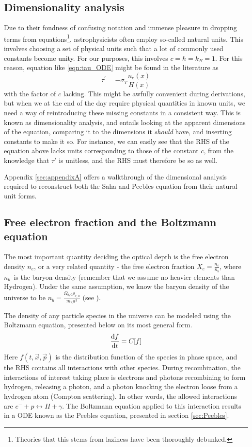 \documentclass[10pt, a4paper]{article}
\begin{document}
\subsection{Dimensionality analysis}
Due to their fondness of confusing notation and immense pleasure in dropping terms from equations\footnote{Theories that this stems from laziness have been thoroughly debunked.}, astrophysicists often employ so-called natural units. This involves choosing a set of physical units such that a lot of commonly used constants become unity. For our purposes, this involves $c = \hbar = k_B = 1$. For this reason, equation like \ref{eqn:tau_ODE} might be found in the literature as
\begin{equation*}
    \tau^\prime = - \sigma_T\frac{n_{e}(x)}{H(x)}
\end{equation*}
with the factor of $c$ lacking. This might be awfully convenient during derivations, but when we at the end of the day require physical quantities in known units, we need a way of reintroducing these missing constants in a consistent way. This is known as dimensionality analysis, and entails looking at the apparent dimensions of the equation, comparing it to the dimensions it \textit{should} have, and inserting constants to make it so. For instance, we can easily see that the RHS of the equation above lacks units corresponding to those of the constant $c$, from the knowledge that $\tau'$ is unitless, and the RHS must therefore be so as well.

Appendix \ref{sec:appendixA} offers a walkthrough of the dimensional analysis required to reconstruct both the Saha and Peebles equation from their natural-unit forms.


\subsection{Free electron fraction and the Boltzmann equation}
The most important quantity deciding the optical depth is the free electron density $n_e$, or a very related quantity - the free electron fraction $X_e = \frac{n_e}{n_b}$, where $n_b$ is the baryon density (remember that we assume no heavier elements than Hydrogen). Under the same assumption, we know the baryon density of the universe to be $n_b = \frac{\Omega_{b,0}\rho_{c,0}}{m_ha^3}$ (see \cite{Milestone1}).

The density of any particle species in the universe can be modeled using the Boltzmann equation, presented below on its most general form.
\begin{equation*}
    \dv{f}{t} = C[f]
\end{equation*}
Here $f(t, \vec{x}, \vec{p})$ is the distribution function of the species in phase space, and the RHS contains all interactions with other species. During recombination, the interactions of interest taking place is electrons and photons recombining to form hydrogen, releasing a photon, and a photon knocking the electron loose from a hydrogen atom (Compton scattering). In other words, the allowed interactions are $e^- + p \leftrightarrow H + \gamma$. The Boltzmann equation applied to this interaction results in a ODE known as the Peebles equation, presented in section \ref{sec:Peebles}. 
\end{document}
